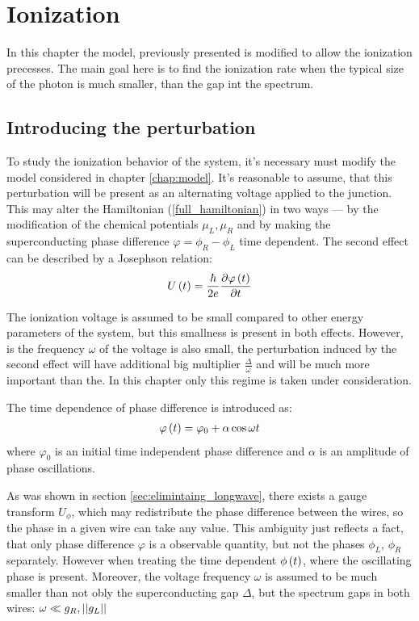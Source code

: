 \chapter{Ionization}

In this chapter the model, previously presented is modified to allow the ionization precesses. The main goal here is to find the ionization rate when the typical size of the photon is much smaller, than the gap int the spectrum.

\section{Introducing the perturbation}

To study the ionization behavior of the system, it's necessary must modify the model considered in chapter \ref{chap:model}. It's reasonable to assume, that this perturbation will be present as an alternating voltage applied to the junction. This may alter the Hamiltonian (\ref{full_hamiltonian}) in two ways --- by the modification of the chemical potentials $ \mu_L, \mu_R $ and by making the superconducting phase difference $ \varphi=\phi_R-\phi_L $ time dependent. The second effect can be described by a Josephson relation:
\begin{gather}
	U\left(t\right)
	=
	\frac{\hbar}{2e}
	\frac{\partial\varphi\left(t\right)}{\partial t}
\end{gather}

The ionization voltage is assumed to be small compared to other energy parameters of the system, but this smallness is present in both effects. However, is the frequency $ \omega $ of the voltage is also small, the perturbation induced by the second effect will have additional big multiplier $ \frac{\Delta}{\omega} $ and will be much more important than the. In this chapter only this regime is taken under consideration.

The time dependence of phase difference is introduced as:
\begin{gather}
	\varphi\left(t\right)=\varphi_0+\alpha\cos\omega t
\end{gather}
where $ \varphi_0 $ is an initial time independent phase difference and $ \alpha $ is an amplitude of phase oscillations.

As was shown in section \ref{sec:elimintaing_longwave}, there exists a gauge transform $ U_\phi $, which may redistribute the phase difference between the wires, so the phase in a given wire can take any value. This ambiguity just reflects a  fact, that only phase difference $ \varphi $ is a observable quantity, but not the phases $ \phi_L $, $ \phi_R $ separately. However when treating the time dependent $ \phi\left(t\right) $, where the oscillating phase is present. Moreover, the voltage frequency $ \omega $ is assumed to be much smaller than not obly the superconducting gap $ \Delta $, but the spectrum gaps in both wires: $ \omega\ll g_R, \left||g_L|\right| $

